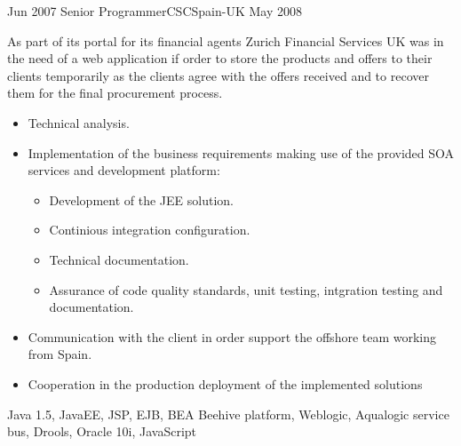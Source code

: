 \begin{experiences}
  
  
  \emptySeparator
  
  
  
  \experience
  {Jun 2007}       {Senior Programmer}{CSC}{Spain-UK}
  {May 2008}   {
  
  As part of its portal for its financial agents Zurich Financial Services UK was in the need of a web application if order to store the products and offers to their clients temporarily as the clients agree with the offers received and to recover them for the final procurement process.
  
                      \begin{itemize}
                        
                        \item Technical analysis. 

                        \item Implementation of the business requirements making use of the provided SOA services and development platform:
                        \begin{itemize}
                          \item Development of the JEE solution.
                          \item Continious integration configuration.
                          \item Technical documentation.
                          \item Assurance of code quality standards, unit testing, intgration testing and documentation. 
                        \end{itemize}

                        \item Communication with the client in order support the offshore team working from Spain.

                        \item Cooperation in the production deployment of the implemented solutions
                        
                        
                      \end{itemize}
                    }                    
                    {Java 1.5, JavaEE, JSP, EJB, BEA Beehive platform, Weblogic, Aqualogic service bus, Drools, Oracle 10i, JavaScript}
                    
                    
                    
  \emptySeparator 
  

\end{experiences}

